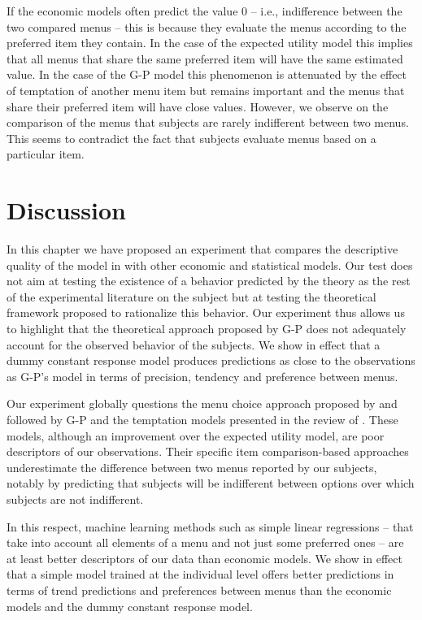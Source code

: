 \documentclass[
]{book}
\begin{document}
If the economic models often predict the value 0 -- i.e., indifference between
the two compared menus -- this is because they evaluate the
menus according to the preferred item they contain.
In the case of the expected utility model this implies that all menus that share the
same preferred item will have the same estimated value.
In the case of the G-P model this phenomenon is attenuated by the effect of
temptation of another menu item but remains important and the menus that share
their preferred item will have close values.
However, we observe on the comparison of the menus that subjects are rarely
indifferent between two menus.
This seems to contradict the fact that subjects evaluate menus based on a
particular item.

\hypertarget{discu3}{%
\section{Discussion}\label{discu3}}

In this chapter we have proposed an experiment that compares the descriptive
quality of the model in \citet{gul2001temptation} with other economic and statistical
models.
Our test does not aim at testing the existence of a behavior predicted by the
theory as the rest of the experimental literature on the subject but at testing
the theoretical framework proposed to rationalize this behavior.
Our experiment thus allows us to highlight that the theoretical approach
proposed by G-P does not adequately account for the observed behavior of the
subjects.
We show in effect that a dummy constant response model produces predictions as
close to the observations as G-P's model in terms of precision, tendency and
preference between menus.

Our experiment globally questions the menu choice approach proposed by
\citet{kreps1979representation} and followed by G-P and the temptation models presented
in the review of \citet{lipman2013temptation}.
These models, although an improvement over the expected utility model, are poor
descriptors of our observations.
Their specific item comparison-based approaches underestimate the
difference between two menus reported by our subjects, notably by predicting
that subjects will be indifferent between options over which subjects are not indifferent.

In this respect, machine learning methods such as simple linear regressions --
that take into account all elements of a menu and not just some preferred ones
-- are at least better descriptors of our data than economic models.
We show in effect that a simple model trained at the individual level offers
better predictions in terms of trend predictions and preferences between menus
than the economic models and the dummy constant response model.
\end{document}
